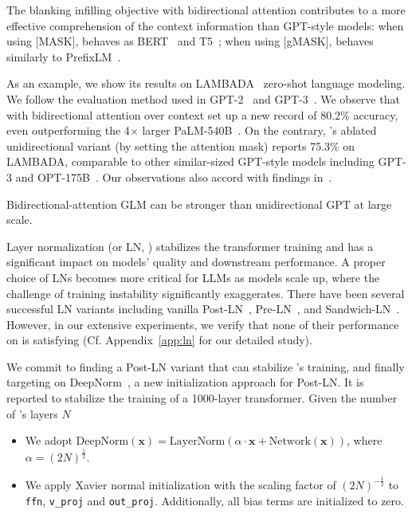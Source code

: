 {The blanking infilling objective with bidirectional attention contributes to a more effective comprehension of the context information than GPT-style models: when using [MASK], \glm behaves as BERT~\citep{devlin2019bert} and T5~\citep{raffel2020exploring}; when using [gMASK], \glm behaves similarly to PrefixLM~\citep{liu2018generating,dong2019unified}.

As an example, we show its results on LAMBADA~\citep{paperno2016lambada} zero-shot language modeling.
We follow the evaluation method used in GPT-2~\citep{radford2019language} and GPT-3~\citep{brown2020language}.
We observe that \glm with bidirectional attention over context set up a new record of 80.2\% accuracy, even outperforming the 4$\times$ larger PaLM-540B~\citep{chowdhery2022palm}.
On the contrary, \glm's ablated unidirectional variant (by setting the attention mask) reports 75.3\% on LAMBADA, comparable to other similar-sized GPT-style models including GPT-3 and OPT-175B~\cite{zhang2022opt}.
Our observations also accord with findings in~\citep{liu2018generating,dong2019unified}.

\begin{insight}
\rm Bidirectional-attention GLM can be stronger than unidirectional GPT at large scale.
\end{insight}

Layer normalization (or LN, \cite{ba2016layer}) stabilizes the transformer training and has a significant impact on models' quality and downstream performance.
A proper choice of LNs becomes more critical for LLMs as models scale up, where the challenge of training instability significantly exaggerates. %
There have been several successful LN variants including vanilla Post-LN~\citep{vaswani2017attention}, Pre-LN~\citep{xiong2020layer}, and Sandwich-LN~\citep{ding2021cogview}. 
However, in our extensive experiments, we verify that none of their performance on \glm is satisfying (Cf. Appendix~\ref{app:ln} for our detailed study).

We commit to finding a Post-LN variant that can stabilize \glm's training, and finally targeting on DeepNorm~\citep{wang2022deepnet}, a new initialization approach for Post-LN.
It is reported to stabilize the training of a 1000-layer transformer.
Given the number of \glm's layers $N$

\begin{itemize}[leftmargin=*,itemsep=0pt,parsep=0.2em,topsep=0.0em,partopsep=0.0em]
    \item We adopt $\textrm{DeepNorm}(\boldsymbol{x}) = \textrm{LayerNorm}(\alpha\cdot \boldsymbol{x} + \textrm{Network}(\boldsymbol{x}))$, where $\alpha=(2N)^\frac{1}{2}$.
    \item We apply Xavier normal initialization with the scaling factor of $(2N)^{-\frac{1}{2}}$ to \texttt{ffn}, \texttt{v\_proj} and \texttt{out\_proj}. Additionally, all bias terms are initialized to zero.
\end{itemize}

}
